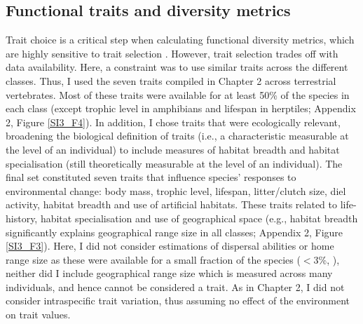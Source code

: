 \subsection{Functional traits and diversity metrics}
Trait choice is a critical step when calculating functional diversity metrics, which are highly sensitive to trait selection \citep{Mouillot2021}. However, trait selection trades off with data availability. Here, a constraint was to use similar traits across the different classes. %
Thus, I used the seven traits compiled in Chapter 2 across terrestrial vertebrates. Most of these traits were available for at least 50\% of the species in each class (except trophic level in amphibians and lifespan in herptiles; Appendix 2, Figure \ref{SI3_F4}). In addition, I chose traits that were ecologically relevant, broadening the biological definition of traits (i.e., a characteristic measurable at the level of an individual) to include measures of habitat breadth and habitat specialisation (still theoretically measurable at the level of an individual).  The final set constituted seven traits that influence species' responses to environmental change: body mass, trophic level, lifespan, litter/clutch size, diel activity, habitat breadth and use of artificial habitats. These traits related to life-history, habitat specialisation and use of geographical space (e.g., habitat breadth significantly explains geographical range size in all classes; Appendix 2, Figure \ref{SI3_F3}). Here, I did not consider estimations of dispersal abilities or home range size as these were available for a small fraction of the species ($<$3\%, \cite{AlexSmith2005, Paradis1998, Sutherland2000, Whitmee2013a}), neither did I include geographical range size which is measured across many individuals, and hence cannot be considered a trait. As in Chapter 2, I did not consider intraspecific trait variation, thus assuming no effect of the environment on trait values.

